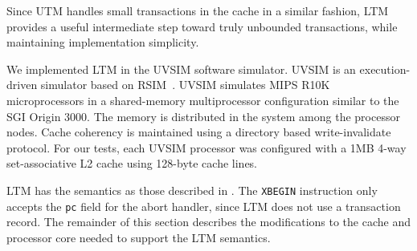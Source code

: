 Since UTM handles small transactions in the
cache in a similar fashion, LTM provides a useful intermediate step
toward truly unbounded transactions, while maintaining implementation
simplicity.

We implemented LTM in the UVSIM software simulator. UVSIM is an
execution-driven simulator based on RSIM~\cite{PaiRaAd97}.  UVSIM
simulates MIPS R10K~\cite{MIPSR10K} microprocessors in a shared-memory
multiprocessor configuration similar to the SGI Origin 3000.  The
memory is distributed in the system among the processor nodes. Cache
coherency is maintained using a directory based write-invalidate
protocol. For our tests, each UVSIM processor was configured with a
1MB 4-way set-associative L2 cache using 128-byte cache lines.

LTM has the semantics as those described in .  The
\texttt{XBEGIN} instruction only accepts the \texttt{pc} field for the
abort handler, since LTM does not use a transaction record.  The
remainder of this section describes the modifications to the cache and
processor core needed to support the LTM semantics.


